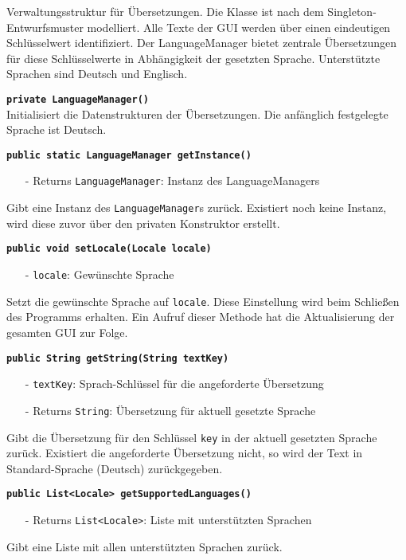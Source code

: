 \documentclass[parskip=full,11pt,twoside]{scrartcl}
\begin{document}
Verwaltungsstruktur für Übersetzungen. Die Klasse ist nach dem Singleton-Entwurfsmuster modelliert. Alle Texte der GUI werden über einen eindeutigen Schlüsselwert identifiziert. Der LanguageManager bietet zentrale Übersetzungen für diese Schlüsselwerte in Abhängigkeit der gesetzten Sprache. Unterstützte Sprachen sind Deutsch und Englisch.

\textbf{\texttt{private LanguageManager()}}\\
Initialisiert die Datenstrukturen der Übersetzungen. Die anfänglich festgelegte Sprache ist Deutsch.

\textbf{\texttt{public static LanguageManager getInstance()}}
\begin{itemize}[noitemsep]
	\item[-] Returns \texttt{LanguageManager}: Instanz des LanguageManagers
\end{itemize}
Gibt eine Instanz des \texttt{LanguageManager}s zurück. Existiert noch keine Instanz, wird diese zuvor über den privaten Konstruktor erstellt.

\textbf{\texttt{public void setLocale(Locale locale)}}
\begin{itemize}[noitemsep]
	\item[-] \texttt{locale}: Gewünschte Sprache
\end{itemize}
Setzt die gewünschte Sprache auf \texttt{locale}. Diese Einstellung wird beim Schließen des Programms erhalten. Ein Aufruf dieser Methode hat die Aktualisierung der gesamten GUI zur Folge.

\textbf{\texttt{public String getString(String textKey)}}
\begin{itemize}[noitemsep]
	\item[-] \texttt{textKey}: Sprach-Schlüssel für die angeforderte Übersetzung
	\item[-] Returns \texttt{String}: Übersetzung für aktuell gesetzte Sprache
\end{itemize}
Gibt die Übersetzung für den Schlüssel \texttt{key} in der aktuell gesetzten Sprache zurück. Existiert die angeforderte Übersetzung nicht, so wird der Text in Standard-Sprache (Deutsch) zurückgegeben.

\textbf{\texttt{public List<Locale> getSupportedLanguages()}}
\begin{itemize}[noitemsep]
    \item[-] Returns \texttt{List<Locale>}: Liste mit unterstützten Sprachen
\end{itemize}
Gibt eine Liste mit allen unterstützten Sprachen zurück.
\end{document}
